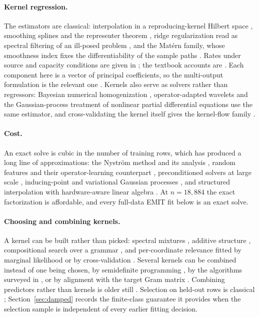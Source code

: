 \documentclass[11pt]{article}
\newcommand{\1}{\mathbf{1}}
\begin{document}
\paragraph{Kernel regression.}
The estimators are classical: interpolation in a reproducing-kernel Hilbert space
\cite{aronszajn}, smoothing splines and the representer theorem
\cite{kimeldorf,wahba,representer}, ridge regularization \cite{hoerl} read as spectral filtering
of an ill-posed problem \cite{engl}, and the Mat\'ern family, whose smoothness index fixes the
differentiability of the sample paths \cite{stein,rw}. Rates under source and capacity conditions
are given in \cite{cdv,sutherland,fs,smalezhou}; the textbook accounts are
\cite{scholkopf,steinwart,esl}. Each component here is a vector of principal coefficients, so the
multi-output formulation is the relevant one \cite{micchelli,alvarez}. Kernels also serve as
solvers rather than regressors: Bayesian numerical homogenization \cite{owhadibnh},
operator-adapted wavelets \cite{owhadiscovel} and the Gaussian-process treatment of nonlinear
partial differential equations \cite{chenowhadi} use the same estimator, and cross-validating the
kernel itself gives the kernel-flow family \cite{owhadiyoo,hamziowhadi,yoo}.

\paragraph{Cost.}
An exact solve is cubic in the number of training rows, which has produced a long line of
approximations: the Nystr\"om method and its analysis \cite{nystrom,drineas,bachlowrank}, random
features \cite{rahimirecht} and their operator-learning counterpart \cite{nelsenstuart},
preconditioned solvers at large scale \cite{falkon,meanti}, inducing-point and variational
Gaussian processes \cite{quinonero,titsias,hensman}, and structured interpolation with
hardware-aware linear algebra \cite{kissgp,gpytorch}. At $n = 18{,}884$ the exact factorization is
affordable, and every full-data EMIT fit below is an exact solve.

\paragraph{Choosing and combining kernels.}
A kernel can be built rather than picked: spectral mixtures \cite{wilsonadams}, additive structure
\cite{additivegp}, compositional search over a grammar \cite{duvenaudstructure}, and
per-coordinate relevance fitted by marginal likelihood \cite{rw} or by cross-validation
\cite{owhadiyoo}. Several kernels can be combined instead of one being chosen, by semidefinite
programming \cite{lanckriet}, by the algorithms surveyed in \cite{gonen}, or by alignment with the
target Gram matrix \cite{cristianini,cortesalign}. Combining predictors rather than kernels is
older still \cite{bates-granger,wolpert,breiman}. Selection on held-out rows is classical
\cite{stonecv,gcv,arlot}; Section~\ref{sec:damped} records the finite-class guarantee it
provides when the selection sample is independent of every earlier fitting decision.
\end{document}
